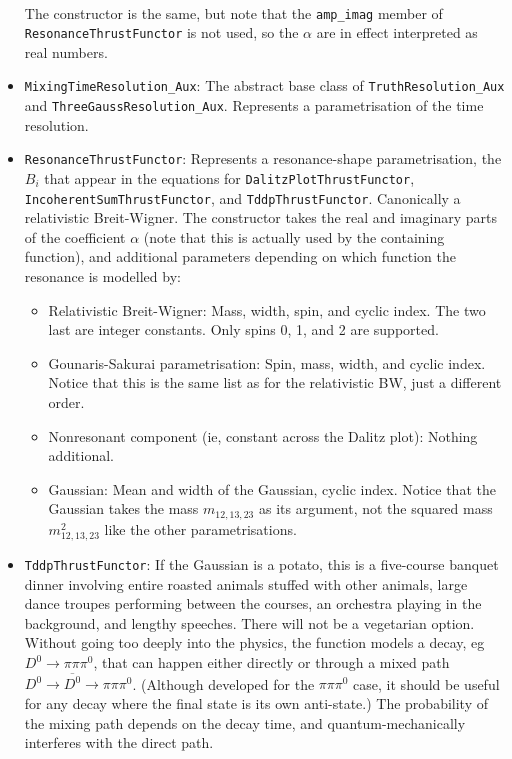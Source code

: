 \documentclass[12pt,pdflatex]{article}
\begin{document}
\begin{itemize}
\begin{eqnarray}
\end{eqnarray}
The constructor is the same, but note that the \texttt{amp\_imag} member of \texttt{ResonanceThrustFunctor}
is not used, so the $\alpha$ are in effect interpreted as real numbers. 
\item \texttt{MixingTimeResolution\_Aux}: The abstract base class of \texttt{TruthResolution\_Aux}
and \texttt{ThreeGaussResolution\_Aux}. Represents a parametrisation of the time resolution. 
\item \texttt{ResonanceThrustFunctor}: Represents a resonance-shape parametrisation, the $B_i$
that appear in the equations for \texttt{DalitzPlotThrustFunctor}, \texttt{IncoherentSumThrustFunctor},
and \texttt{TddpThrustFunctor}. Canonically a relativistic Breit-Wigner. The constructor takes
the real and imaginary parts of the coefficient $\alpha$ (note that this is actually used by
the containing function), and additional parameters depending on which function the resonance
is modelled by:
\begin{itemize}
\item Relativistic Breit-Wigner: Mass, width, spin, and cyclic index. The two last are integer constants.
Only spins 0, 1, and 2 are supported. 
\item Gounaris-Sakurai parametrisation: Spin, mass, width, and cyclic index. Notice that this
is the same list as for the relativistic BW, just a different order.
\item Nonresonant component (ie, constant across the Dalitz plot): Nothing additional.
\item Gaussian: Mean and width of the Gaussian, cyclic index. Notice that the Gaussian
takes the mass $m_{12,13,23}$ as its argument, not the squared mass $m^2_{12,13,23}$
like the other parametrisations. 
\end{itemize}
\item \texttt{TddpThrustFunctor}: If the Gaussian is a potato, this is a five-course banquet
dinner involving entire roasted animals stuffed with other animals, large dance troupes 
performing between the courses, an orchestra playing in the background, and lengthy
speeches. There will not be a vegetarian option. Without going too deeply into the physics, 
the function models a decay, eg $D^0\to\pi\pi\pi^0$, that can happen either directly or
through a mixed path $D^0\to \overline{D^0}\to\pi\pi\pi^0$. (Although developed for the
$\pi\pi\pi^0$ case, it should be useful for any decay where the final state is its own anti-state.)
The probability of the mixing
path depends on the decay time, and quantum-mechanically interferes with the direct path.

\end{itemize}
\end{document}
